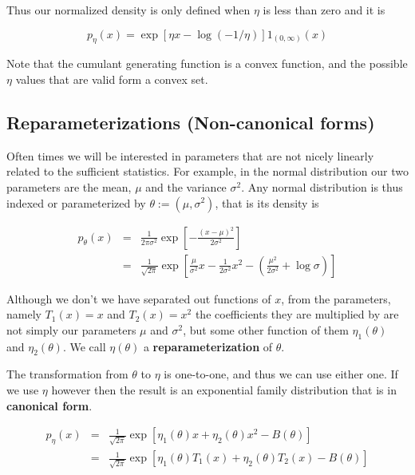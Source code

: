 \documentclass[oneside]{article}
\begin{document}
Thus our normalized density is only defined when $\eta$ is less than zero and it is

\begin{equation}
p_\eta(x) = \exp[\eta x - \log(-1/\eta)] 1_{(0,\infty)}(x)
\end{equation}

Note that the cumulant generating function is a convex function, and the possible $\eta$ values that are valid form a convex set.

\subsection{Reparameterizations (Non-canonical forms)}
Often times we will be interested in parameters that are not nicely linearly related to the sufficient statistics. For example, in the normal distribution our two parameters are the mean, $\mu$ and the variance $\sigma^2$. Any normal distribution is thus indexed or parameterized by $\theta := (\mu, \sigma^2)$, that is its density is

\begin{eqnarray}
p_\theta(x) &=& \frac{1}{2 \pi \sigma^2} \exp \left[ -\frac{(x-\mu)^2}{2\sigma^2} \right] \nonumber\\
&=& \frac{1}{\sqrt{2\pi}}\exp \left[ \frac{\mu}{\sigma^2} x - \frac{1}{2\sigma^2} x^2 - \left( \frac{\mu^2}{2\sigma^2} + \log \sigma \right) \right]
\end{eqnarray}

Although we don't we have separated out functions of $x$, from the parameters, namely $T_1(x) = x$ and $T_2(x) = x^2$ the coefficients they are multiplied by are not simply our parameters $\mu$ and $\sigma^2$, but some other function of them $\eta_1(\theta)$ and $\eta_2(\theta)$. We call $\eta(\theta)$ a \textbf{reparameterization} of $\theta$. 

The transformation from $\theta$ to $\eta$ is one-to-one, and thus we can use either one. If we use $\eta$ however then the result is an exponential family distribution that is in \textbf{canonical form}. 

\begin{eqnarray}
p_\eta(x) &=& \frac{1}{\sqrt{2\pi}}\exp \left[ \eta_1(\theta) x + \eta_2(\theta) x^2 - B(\theta) \right]\nonumber\\
&=& \frac{1}{\sqrt{2\pi}}\exp \left[ \eta_1(\theta) T_1(x) + \eta_2(\theta) T_2(x) - B(\theta) \right]
\end{eqnarray}
\end{document}
